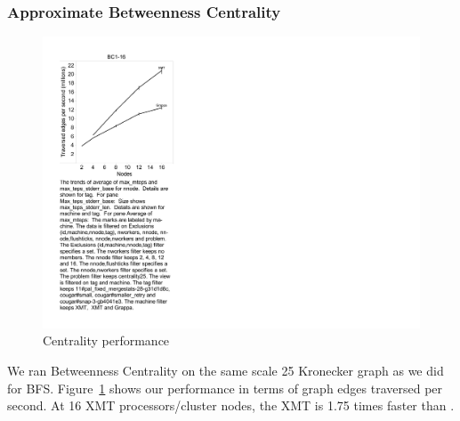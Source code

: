 {\subsubsection{Approximate Betweenness Centrality}
\begin{figure}[tH]
\begin{center}
  \includegraphics[width=0.95\columnwidth]{figs/centrality_performance}
\begin{minipage}{0.95\columnwidth}
  \caption{\label{fig:centrality-performance} Centrality performance}
\end{minipage}
\vspace{-3ex}
\end{center}
\end{figure}

We ran Betweenness Centrality on the same scale 25 Kronecker graph as
we did for BFS. Figure~\ref{fig:centrality-performance} shows our
performance in terms of graph edges traversed per second. At 16 XMT
processors/cluster nodes, the XMT is 1.75 times faster than \Grappa.


}
